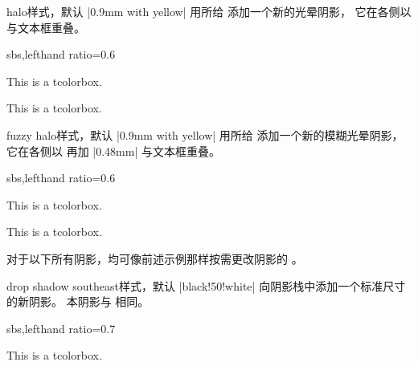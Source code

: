 \begin{docTcbKey}{halo}{}{样式，默认 |0.9mm with yellow|}
  用所给  添加一个新的光晕阴影，
  它在各侧以  与文本框重叠。
\begin{dispExample*}{sbs,lefthand ratio=0.6}

\begin{tcolorbox}[title=My own halo,halo]
This is a tcolorbox.
\end{tcolorbox}
\par\bigskip\bigskip
\begin{tcolorbox}[title=Another halo,
  halo=2mm with green]
This is a tcolorbox.
\end{tcolorbox}
\end{dispExample*}
\end{docTcbKey}

\enlargethispage*{2cm}
\begin{docTcbKey}{fuzzy halo}{}{样式，默认 |0.9mm with yellow|}
  用所给  添加一个新的模糊光晕阴影，
  它在各侧以  再加 |0.48mm| 与文本框重叠。
\begin{dispExample*}{sbs,lefthand ratio=0.6}

\begin{tcolorbox}[title=My own halo,fuzzy halo]
This is a tcolorbox.
\end{tcolorbox}
\par\bigskip\bigskip
\begin{tcolorbox}[title=Another halo,
  fuzzy halo=2mm with green]
This is a tcolorbox.
\end{tcolorbox}
\end{dispExample*}

\begin{dispExample}
\begin{tcolorbox}[blank,enhanced jigsaw,boxsep=2pt,arc=2pt,
  fuzzy halo=2mm with red!50!white,
  fuzzy halo=1mm with white]
\lipsum[1]
\end{tcolorbox}
\end{dispExample}
\end{docTcbKey}


\clearpage
对于以下所有阴影，均可像前述示例那样按需更改阴影的 。

\begin{docTcbKey}{drop shadow southeast}{}{样式，默认 |black!50!white|}
  向阴影栈中添加一个标准尺寸的新阴影。
  本阴影与  相同。
\begin{dispExample*}{sbs,lefthand ratio=0.7}
\begin{tcolorbox}[drop shadow southeast,
  enhanced,colback=red!5!white,colframe=red!75!black]
  This is a tcolorbox.
\end{tcolorbox}
\end{dispExample*}
\end{docTcbKey}%

